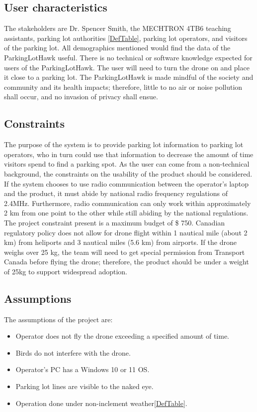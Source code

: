 \documentclass{article}
\begin{document}
\subsection{User characteristics}
The stakeholders are Dr. Spencer Smith, the MECHTRON 4TB6 teaching assistants, parking lot authorities \ref{DefTable}, parking lot operators, and visitors of the parking lot. All demographics mentioned would find the data of the ParkingLotHawk useful. There is no technical or software knowledge expected for users of the ParkingLotHawk. The user will need to turn the drone on and place it close to a parking lot.  The ParkingLotHawk is made mindful of the society and community and its health impacts; therefore, little to no air or noise pollution shall occur, and no invasion of privacy shall ensue.
\subsection{Constraints}
\label{sec:Constraints}
The purpose of the system is to provide parking lot information to parking lot operators, who in turn could use that information to decrease the amount of time visitors spend to find a parking spot. As the user can come from a non-technical background, the constraints on the usability of the product should be considered. If the system chooses to use radio communication between the operator's laptop and the product, it must abide by national radio frequency regulations of 2.4MHz. Furthermore, radio communication can only work within approximately 2 km from one point to the other while still abiding by the national regulations. The project constraint present is a maximum budget of \$ 750.  Canadian regulatory policy does not allow for drone flight within 1 nautical mile (about 2 km) from heliports and 3 nautical miles (5.6 km) from airports\cite{canada_flying_2020}. If the drone weighs over 25 kg, the team will need to get special permission from Transport Canada before flying the drone\cite{canada_find_2021}; therefore, the product should be under a weight of 25kg to support widespread adoption.
\subsection{Assumptions}
\label{sec:Assumptions}
The assumptions of the project are:
\begin{itemize}

  \item Operator does not fly the drone exceeding a specified amount of time.
  \item Birds do not interfere with the drone.
  \item Operator's PC has a Windows 10 or 11 OS.
  \item Parking lot lines are visible to the naked eye.
  \item Operation done under non-inclement weather\ref{DefTable}. 

\end{itemize}
\end{document}
